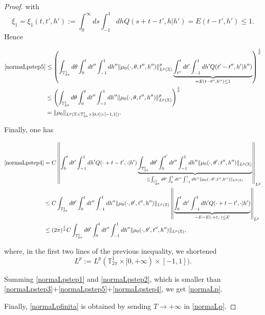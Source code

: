 \documentclass[10pt,a4paper]{amsart}
\begin{document}
\begin{proof}
with
\[
\xi_1=\xi_1(t,t',h'):=\int_0^{\infty}ds\int_{-1}^1dhQ(s+t-t',h|h')=E(t-t',h')\leq1.
\]
Hence

{\footnotesize\begin{align*}
\eqref{normaLpstep5}&\leq\left(\int_{\mathbb{T}^1_{2\pi}}d\theta\int_0^tdt''\int_{-1}^1dh''\|\mu_0(\cdot,\theta,t'',h'')\|_{L^p(\mathbb{X})}^p\underbrace{\int_{t''}^tdt'\int_{-1}^1dh'Q(t'-t'',h'|h'')}_{=E(t-t'',h'')\leq1}\right)^{\frac{1}{p}}
\\
&\leq\left(\int_{\mathbb{T}^1_{2\pi}}d\theta\int_0^tdt''\int_{-1}^1dh''\|\mu_0(\cdot,\theta,t'',h'')\|_{L^p(\mathbb{X})}^p\right)^{\frac{1}{p}}
\\
&=\|\mu_0\|_{L^p(\mathbb{X}\times\mathbb{T}^1_{2\pi}\times[0,t]\times\mathbb[-1,1])}.
\end{align*}}

Finally, one has

{\footnotesize\begin{align*}
\eqref{normaLpstep4}&=C\left\|\int_0^tdt'\int_{-1}^1dh'Q(\cdot+t-t',\cdot|h')\underbrace{\int_{\mathbb{T}^1_{2\pi}}d\theta'\int_0^{t'}dt''\int_{-1}^1dh''\|\mu_0(\cdot,\theta',t'',h'')\|_{L^p(\mathbb{X})}}_{\leq\int_{\mathbb{T}^1_{2\pi}}d\theta'\int_0^tdt''\int_{-1}^1dh''\|\mu_0(\cdot,\theta',t'',h'')\|_{L^p(\mathbb{X})}}\right\|_{L^p}
\\
&\leq C\int_{\mathbb{T}^1_{2\pi}}d\theta'\int_0^tdt''\int_{-1}^1dh''\|\mu_0(\cdot,\theta',t'',h'')\|_{L^p(\mathbb{X})}\left\|\underbrace{\int_0^tdt'\int_{-1}^1dh'Q(\cdot+t-t',\cdot|h')}_{=E-E(\cdot+t,\cdot)\leq E}\right\|_{L^p}
\\
&\leq(2\pi)^{\frac{1}{p}} C\int_{\mathbb{T}^1_{2\pi}}d\theta'\int_0^tdt''\int_{-1}^1dh''\|\mu_0(\cdot,\theta',t'',h'')\|_{L^p(\mathbb{X})},
\end{align*}}

where, in the first two lines of the previous inequality, we shortened
\[
L^p:=L^p(\mathbb{T}^1_{2\pi}\times[0,+\infty)\times[-1,1]).
\]

Summing \eqref{normaLpstep1} and \eqref{normaLpstep2}, which is smaller than \eqref{normaLpstep3}+\eqref{normaLpstep5}+\eqref{normaLpstep4}, we get \eqref{normaLp}.

Finally, \eqref{normaLpfinita} is obtained by sending $T\to+\infty$ in \eqref{normaLp}.
\end{proof}
\end{document}
